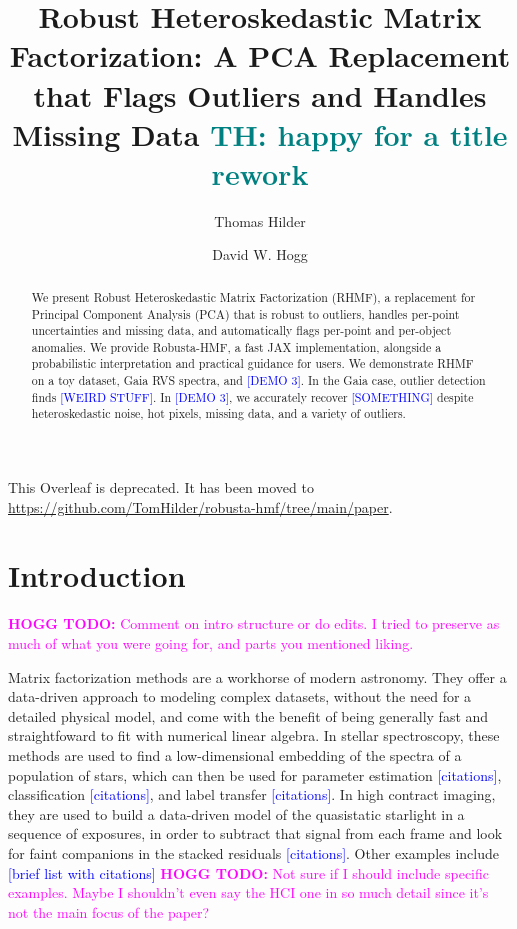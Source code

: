 \documentclass[onecolumn,floatfix]{aastex631}
\newcommand{\tom}[1]{\textcolor{teal}{\textbf{TH:} #1}}
\newcommand{\hoggtodo}[1]{\textcolor{magenta}{\textbf{HOGG TODO:} #1}}
\newcommand{\placeholder}[1]{\textcolor{blue}{[#1]}}
\begin{document}
\title{Robust Heteroskedastic Matrix Factorization: A PCA Replacement that Flags Outliers and Handles Missing Data \tom{happy for a title rework}}
\author[0000-0001-7641-5235]{Thomas Hilder}
\author[0000-0003-2866-9403]{David W. Hogg}
\affiliation{\hoggtodo{Add affiliations}}

\begin{abstract}
    We present Robust Heteroskedastic Matrix Factorization (RHMF), a replacement for Principal Component Analysis (PCA) that is robust to outliers, handles per-point uncertainties and missing data, and automatically flags per-point and per-object anomalies.
    We provide Robusta-HMF, a fast JAX implementation, alongside a probabilistic interpretation and practical guidance for users.
    We demonstrate RHMF on a toy dataset, Gaia RVS spectra, and \placeholder{DEMO 3}.
    In the Gaia case, outlier detection finds \placeholder{WEIRD STUFF}.
    In \placeholder{DEMO 3}, we accurately recover \placeholder{SOMETHING} despite heteroskedastic noise, hot pixels, missing data, and a variety of outliers.
\end{abstract}

This Overleaf is deprecated. It has been moved to \url{https://github.com/TomHilder/robusta-hmf/tree/main/paper}.

\newpage

\section{Introduction}

\hoggtodo{Comment on intro structure or do edits. I tried to preserve as much of what you were going for, and parts you mentioned liking.}


Matrix factorization methods are a workhorse of modern astronomy.
They offer a data-driven approach to modeling complex datasets, without the need for a detailed physical model, and come with the benefit of being generally fast and straightfoward to fit with numerical linear algebra.
In stellar spectroscopy, these methods are used to find a low-dimensional embedding of the spectra of a population of stars, which can then be used for parameter estimation \placeholder{citations}, classification \placeholder{citations}, and label transfer \placeholder{citations}.
In high contract imaging, they are used to build a data-driven model of the quasistatic starlight in a sequence of exposures, in order to subtract that signal from each frame and look for faint companions in the stacked residuals \placeholder{citations}.
Other examples include \placeholder{brief list with citations} \hoggtodo{Not sure if I should include specific examples. Maybe I shouldn't even say the HCI one in so much detail since it's not the main focus of the paper?}
\end{document}
